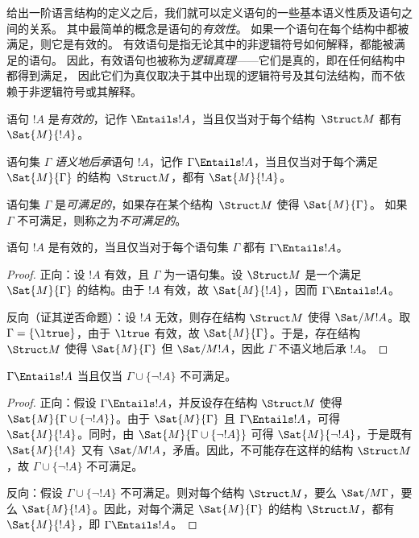 \documentclass[../../../include/open-logic-section]{subfiles}
\begin{document}

\begin{explain}
给出一阶语言结构的定义之后，我们就可以定义语句的一些基本语义性质及语句之间的关系。
其中最简单的概念是语句的\emph{有效性}。
如果一个语句在每个结构中都被满足，则它是有效的。
有效语句是指无论其中的非逻辑符号如何解释，都能被满足的语句。
因此，有效语句也被称为\emph{逻辑真理}——它们是真的，即在任何结构中都得到满足，
因此它们为真仅取决于其中出现的逻辑符号及其句法结构，而不依赖于非逻辑符号或其解释。
\end{explain}

\begin{defn}[有效性]
语句 $!A$ 是\emph{有效的}，记作 $\Entails !A$，当且仅当对于每个结构~$\Struct M$ 都有 $\Sat{M}{!A}$。
\end{defn}

\begin{defn}[后承]
语句集 $\Gamma$ \emph{语义地后承}语句 $!A$，记作 $\Gamma
\Entails !A$，当且仅当对于每个满足 $\Sat{M}{\Gamma}$ 的结构~$\Struct M$，都有 $\Sat{M}{!A}$。
\end{defn}

\begin{defn}[可满足性]
语句集 $\Gamma$ 是\emph{可满足的}，如果存在某个结构~$\Struct M$ 使得 $\Sat{M}{\Gamma}$。
如果 $\Gamma$ 不可满足，则称之为\emph{不可满足的}。
\end{defn}

\begin{prop}
语句 $!A$ 是有效的，当且仅当对于每个语句集 $\Gamma$ 都有 $\Gamma \Entails !A$。
\end{prop}

\begin{proof}
正向：设 $!A$ 有效，且 $\Gamma$ 为一语句集。设 $\Struct M$ 是一个满足 $\Sat{M}{\Gamma}$ 的结构。由于 $!A$ 有效，故 $\Sat{M}{!A}$，因而 $\Gamma \Entails !A$。

反向（证其逆否命题）：设 $!A$ 无效，则存在结构 $\Struct M$ 使得 $\Sat/{M}{!A}$。取 $\Gamma = \{ \ltrue \}$，由于 $\ltrue$ 有效，故 $\Sat{M}{\Gamma}$。于是，存在结构 $\Struct M$ 使得 $\Sat{M}{\Gamma}$ 但 $\Sat/{M}{!A}$，因此 $\Gamma$ 不语义地后承 $!A$。
\end{proof}

\begin{prop}
$\Gamma \Entails !A$ 当且仅当 $\Gamma \cup \{\lnot !A\}$ 不可满足。
\end{prop}

\begin{proof}
正向：假设 $\Gamma \Entails !A$，并反设存在结构 $\Struct M$ 使得 $\Sat{M}{\Gamma
  \cup \{ \lnot !A \}}$。由于 $\Sat{M}{\Gamma}$ 且 $\Gamma \Entails !A$，可得 $\Sat{M}{!A}$。同时，由 $\Sat{M}{\Gamma\cup \{ \lnot !A \}}$ 可得 $\Sat{M}{\lnot !A}$，于是既有 $\Sat{M}{!A}$ 又有 $\Sat/{M}{!A}$，矛盾。因此，不可能存在这样的结构 $\Struct M$，故 $\Gamma \cup \{ \lnot !A \}$ 不可满足。

反向：假设 $\Gamma \cup \{ \lnot !A \}$ 不可满足。则对每个结构 $\Struct M$，要么 $\Sat/{M}{\Gamma}$，要么 $\Sat{M}{!A}$。因此，对每个满足 $\Sat{M}{\Gamma}$ 的结构 $\Struct M$，都有 $\Sat{M}{!A}$，即 $\Gamma \Entails !A$。
\end{proof}
\end{document}
